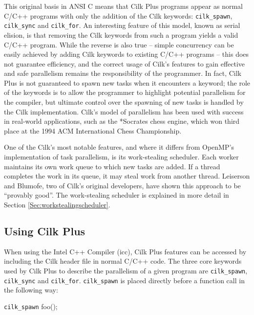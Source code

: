 \documentclass{report}
\begin{document}
This original basis in ANSI C means that Cilk Plus programs appear as normal C/C++ programs with only the addition of the Cilk keywords: \verb!cilk_spawn!, \verb!cilk_sync! and \verb!cilk_for!. An interesting feature of this model, known as serial elision, is that removing the Cilk keywords from such a program yields a valid C/C++ program\cite{Jeffers13}. While the reverse is also true -- simple concurrency can be easily achieved by adding Cilk keywords to existing C/C++ programs -- this does not guarantee efficiency, and the correct usage of Cilk's features to gain effective and safe parallelism remains the responsibility of the programmer. In fact, Cilk Plus is not guaranteed to spawn new tasks when it encounters a keyword; the role of the keywords is to allow the programmer to highlight potential parallelism for the compiler, but ultimate control over the spawning of new tasks is handled by the Cilk implementation. Cilk's model of parallelism has been used with success in real-world applications, such as the *Socrates chess engine, which won third place at the 1994 ACM International Chess Championship\cite{Blumofe95}.

One of the Cilk's most notable features, and where it differs from OpenMP's implementation of task parallelism, is its work-stealing scheduler. Each worker maintains its own work queue to which new tasks are added. If a thread completes the work in its queue, it may steal work from another thread. Leiserson and Blumofe, two of Cilk's original developers, have shown this approach to be “provably good”\cite{Blumofe95}\cite{Leiserson97}. The work-stealing scheduler is explained in more detail in Section \ref{Sec:workstealingscheduler}.

\subsection{Using Cilk Plus} \label{Sec:usingcilkplus}

When using the Intel C++ Compiler (icc), Cilk Plus features can be accessed by including the Cilk header file in normal C/C++ code. The three core keywords used by Cilk Plus to describe the parallelism of a given program are \verb!cilk_spawn!, \verb!cilk_sync! and \verb!cilk_for!. \verb!cilk_spawn! is placed directly before a function call in the following way:

\begin{center}
{\ttfamily \verb!cilk_spawn! foo();}
\end{center}
\end{document}
